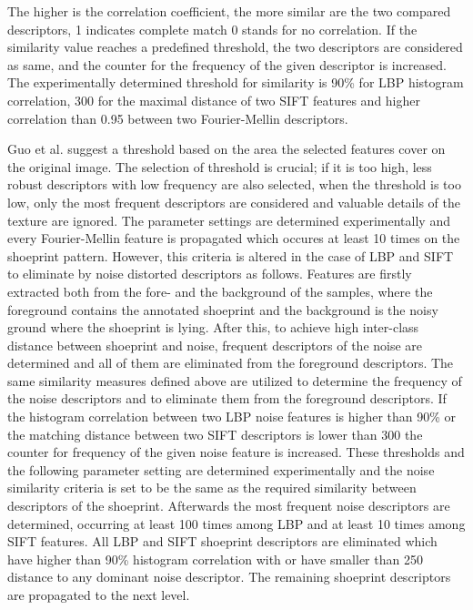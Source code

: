 \documentclass[draft,final]{vutinfth} %
\begin{document}
The higher is the correlation coefficient, the more similar are the two compared descriptors, 1 indicates complete match 0 stands for no correlation.
If the similarity value reaches a predefined threshold, the two descriptors are considered as same, and the counter for the frequency of the given descriptor is increased.
The experimentally determined threshold for similarity is  90\% for LBP histogram correlation, 300 for the maximal distance of two SIFT features and higher correlation than 0.95 between two Fourier-Mellin descriptors.
\par
Guo et al. \cite{guo2012discriminative} suggest a threshold based on the area the selected features cover on the original image.
The selection of threshold is crucial; if it is too high, less robust descriptors with low frequency are also selected, when the threshold is too low, only the most frequent descriptors are considered and valuable details of the texture are ignored.
The parameter settings are determined experimentally and every Fourier-Mellin feature is propagated which occures at least 10 times on the shoeprint pattern.
However, this criteria is altered in the case of LBP and SIFT to eliminate by noise distorted descriptors as follows.
Features are firstly extracted both from the fore- and the background of the samples, where the foreground contains the annotated shoeprint and the background is the noisy ground where the shoeprint is lying. 
After this, to achieve high inter-class distance between shoeprint and noise, frequent descriptors of the noise are determined and all of them are eliminated from the foreground descriptors.
The same similarity measures defined above are utilized to determine the frequency of the noise descriptors and to eliminate them from the foreground descriptors.
If the histogram correlation between two LBP noise features is higher than 90\% or the matching distance between two SIFT descriptors is lower than 300 the counter for frequency of the given noise feature is increased.
These thresholds and the following parameter setting are determined experimentally and the noise similarity criteria is set to be the same as the required similarity between descriptors of the shoeprint.
Afterwards the most frequent noise descriptors are determined, occurring at least 100 times among LBP and at least 10 times among SIFT features.
All LBP and SIFT shoeprint descriptors are eliminated which have higher than 90\% histogram correlation with or have smaller than 250 distance to any dominant noise descriptor.
The remaining shoeprint descriptors are propagated to the next level. 
\end{document}
